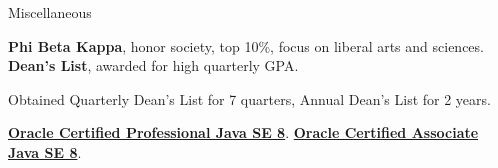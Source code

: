 \begin{rubric}{Miscellaneous}

\entry*[2018] \textbf{Phi Beta Kappa}, honor society, top 10\%, focus on liberal arts and sciences.
\entry*[2016-2018] \textbf{Dean's List}, awarded for high quarterly GPA.
\par Obtained Quarterly Dean's List for 7 quarters, Annual Dean's List for 2 years.

\entry*[2018] \textbf{\href{https://www.youracclaim.com/badges/c3d44a4e-fabc-4abb-b4fd-2079a364f6bd/public_url}{Oracle Certified Professional Java SE 8}}.
\entry*[2017] \textbf{\href{https://www.youracclaim.com/badges/fead7b2a-0382-45ea-9566-fb5a39d71972/public_url}{Oracle Certified Associate Java SE 8}}.

\end{rubric}
